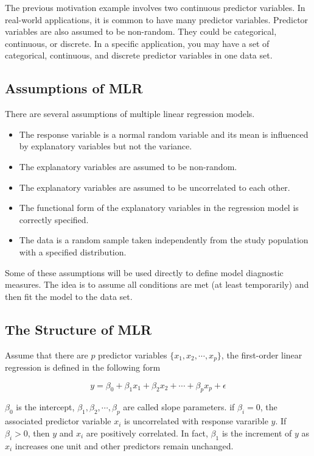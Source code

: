 \documentclass[
]{book}
\begin{document}
The previous motivation example involves two continuous predictor variables. In real-world applications, it is common to have many predictor variables. Predictor variables are also assumed to be non-random. They could be categorical, continuous, or discrete. In a specific application, you may have a set of categorical, continuous, and discrete predictor variables in one data set.

\hypertarget{assumptions-of-mlr}{%
\subsection{Assumptions of MLR}\label{assumptions-of-mlr}}

There are several assumptions of multiple linear regression models.

\begin{itemize}
\item
  The response variable is a normal random variable and its mean is influenced by explanatory variables but not the variance.
\item
  The explanatory variables are assumed to be non-random.
\item
  The explanatory variables are assumed to be uncorrelated to each other.
\item
  The functional form of the explanatory variables in the regression model is correctly specified.
\item
  The data is a random sample taken independently from the study population with a specified distribution.
\end{itemize}

Some of these assumptions will be used directly to define model diagnostic measures. The idea is to assume all conditions are met (at least temporarily) and then fit the model to the data set.

\hypertarget{the-structure-of-mlr}{%
\subsection{The Structure of MLR}\label{the-structure-of-mlr}}

Assume that there are \(p\) predictor variables \(\{x_1, x_2, \cdots, x_p \}\), the first-order linear regression is defined in the following form

\[
y = \beta_0 + \beta_1 x_1 + \beta_2 x_2 + \cdots + \beta_p x_p + \epsilon
\]

\(\beta_0\) is the intercept, \(\beta_1, \beta_2, \cdots, \beta_p\) are called slope parameters. if \(\beta_i=0\), the associated predictor variable \(x_i\) is uncorrelated with response vararible \(y\). If \(\beta_i > 0\), then \(y\) and \(x_i\) are positively correlated. In fact, \(\beta_1\) is the increment of \(y\) as \(x_i\) increases one unit and other predictors remain unchanged.
\end{document}
